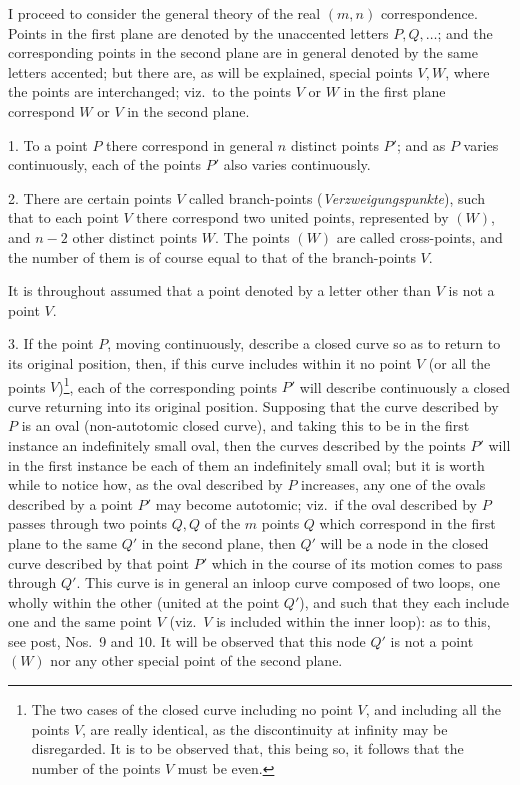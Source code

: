 \documentclass[11pt,a4paper]{article}
\begin{document}
\medskip

I proceed to consider the general theory of the real $(m, n)$ correspondence. Points in the first plane are denoted by the unaccented letters $P, Q, \ldots$; and the corresponding points in the second plane are in general denoted by the same letters accented; but there are, as will be explained, special points $V, W$, where the points are interchanged; viz.\ to the points $V$ or $W$ in the first plane correspond $W$ or $V$ in the second plane.

\medskip

1. To a point $P$ there correspond in general $n$ distinct points $P'$; and as $P$ varies continuously, each of the points $P'$ also varies continuously.

\medskip

2. There are certain points $V$ called branch-points (\emph{Verzweigungspunkte}), such that to each point $V$ there correspond two united points, represented by $(W)$, and $n - 2$ other distinct points $W$. The points $(W)$ are called cross-points, and the number of them is of course equal to that of the branch-points $V$.

\medskip

It is throughout assumed that a point denoted by a letter other than $V$ is not a point $V$.

\medskip

3. If the point $P$, moving continuously, describe a closed curve so as to return to its original position, then, if this curve includes within it no point $V$ (or all the points $V$)\footnote{The two cases of the closed curve including no point $V$, and including all the points $V$, are really identical, as the discontinuity at infinity may be disregarded. It is to be observed that, this being so, it follows that the number of the points $V$ must be even.}, each of the corresponding points $P'$ will describe continuously a closed curve returning into its original position. Supposing that the curve described by $P$ is an oval (non-autotomic closed curve), and taking this to be in the first instance an indefinitely small oval, then the curves described by the points $P'$ will in the first instance be each of them an indefinitely small oval; but it is worth while to notice how, as the oval described by $P$ increases, any one of the ovals described by a point $P'$ may become autotomic; viz.\ if the oval described by $P$ passes through two points $Q, Q$ of the $m$ points $Q$ which correspond in the first plane to the same $Q'$ in the second plane, then $Q'$ will be a node in the closed curve described by that point $P'$ which in the course of its motion comes to pass through $Q'$. This curve is in general an inloop curve composed of two loops, one wholly within the other (united at the point $Q'$), and such that they each include one and the same point $V$ (viz.\ $V$ is included within the inner loop): as to this, see post, Nos.~9 and 10. It will be observed that this node $Q'$ is not a point $(W)$ nor any other special point of the second plane.
\end{document}

